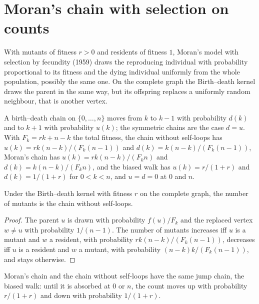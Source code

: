 \section{Moran's chain with selection on counts}\label{sec:moran-selection-counts}
With mutants of fitness $r>0$ and residents of fitness $1$, Moran's model with selection by
fecundity (1959) draws the reproducing individual with probability proportional to its fitness and
the dying individual uniformly from the whole population, possibly the same one. On the complete
graph the Birth--death kernel draws the parent in the same way, but its offspring replaces a
uniformly random neighbour, that is another vertex.
\begin{definition}\label{def:selection-counts}
\leanok{}
A birth--death chain on $\{0,\dots,n\}$ moves from $k$ to $k-1$ with probability $d(k)$ and to
$k+1$ with probability $u(k)$; the symmetric chains are the case $d=u$. With $F_k=rk+n-k$ the
total fitness, the chain without self-loops has $u(k)=rk(n-k)/(F_k(n-1))$ and
$d(k)=k(n-k)/(F_k(n-1))$, Moran's chain has $u(k)=rk(n-k)/(F_kn)$ and $d(k)=k(n-k)/(F_kn)$, and
the biased walk has $u(k)=r/(1+r)$ and $d(k)=1/(1+r)$ for $0<k<n$, and $u=d=0$ at $0$ and $n$.
\end{definition}
\begin{theorem}\label{thm:moran-lumps}
\leanok{}
Under the Birth--death kernel with fitness $r$ on the complete graph, the number of mutants is the
chain without self-loops.
\end{theorem}
\begin{proof}\leanok
The parent $u$ is drawn with probability $f(u)/F_k$ and the replaced vertex $w\neq u$ with
probability $1/(n-1)$. The number of mutants increases iff $u$ is a mutant and $w$ a resident,
with probability $rk(n-k)/(F_k(n-1))$, decreases iff $u$ is a resident and $w$ a mutant, with
probability $(n-k)k/(F_k(n-1))$, and stays otherwise.
\end{proof}
\begin{theorem}\label{thm:selection-jump}
\leanok{}
Moran's chain and the chain without self-loops have the same jump chain, the biased walk: until
it is absorbed at $0$ or $n$, the count moves up with probability $r/(1+r)$ and down with
probability $1/(1+r)$.
\end{theorem}
